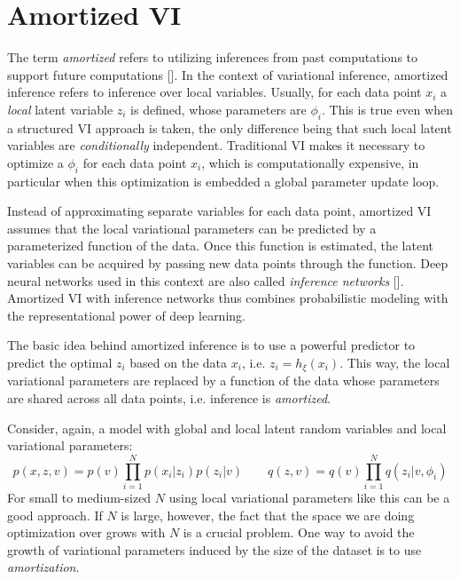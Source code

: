 \section{Amortized VI}\label{sec:amortized}
The term \textit{amortized}  refers to utilizing inferences from past computations to support future computations [\cite{Ritchie2016}]. In the context of variational inference, amortized inference refers to inference over local variables. Usually, for each data point $x_i$ a \textit{local} latent variable $z_i$ is defined, whose parameters are $\phi_i$. This is true even when a structured VI approach is taken, the only difference being that such local latent variables are \textit{conditionally} independent. Traditional VI makes it necessary to optimize a $\phi_i$ for each data point $x_i$, which is computationally expensive, in particular when this optimization is embedded a global parameter update loop.

Instead of approximating separate variables for each data point, amortized VI assumes that the local variational parameters can be predicted by a parameterized function of the data. Once this function is estimated, the latent variables can be acquired by passing new data points through the function. Deep neural networks used in this context are also called \textit{inference networks} [\cite{Kingma2013}]. Amortized VI with inference networks thus combines probabilistic modeling with the representational power of deep learning. 

The basic idea behind amortized inference is to use a powerful predictor to predict the optimal $z_i$ based on the data $x_i$, i.e. $z_i = h_\xi(x_i)$. This way, the local variational parameters are replaced by a function of the data whose parameters are shared across all data points, i.e. inference is \textit{amortized}. 

Consider, again, a model with global and local latent random variables and local variational parameters: 
\begin{equation*}
    p(x,z,v) = p(v)\prod_{i=1}^{N} p(x_i|z_i)p(z_i|v) \qquad q(z,v) = q(v)\prod_{i=1}^{N} q(z_i|v,\phi_i)
\end{equation*}
For small to medium-sized $N$ using local variational parameters like this can be a good approach. If $N$ is large, however, the fact that the space we are doing optimization over grows with $N$ is a crucial problem. One way to avoid the growth of variational parameters induced by the size of the dataset is to use \textit{amortization}.

